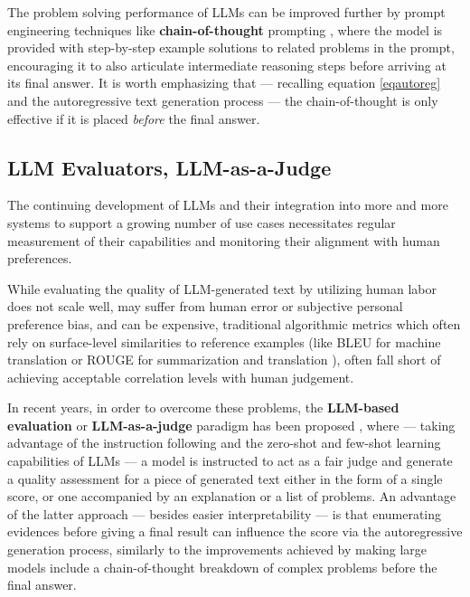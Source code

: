 \documentclass[noindent,nohyp,parspace,titlepage,twoside,12pt]{article}
\begin{document}
      The problem solving performance of LLMs can be improved further by
      prompt engineering techniques like \textbf{chain-of-thought} prompting
      \cite{cot}, where the model is provided with step-by-step example
      solutions to related problems in the prompt, encouraging it to also
      articulate intermediate reasoning steps before arriving at its final
      answer. It is worth emphasizing that --- recalling equation
      \ref{eqautoreg} and the autoregressive text generation process --- the
      chain-of-thought is only effective if it is placed \emph{before} the
      final answer.

    \subsection{LLM Evaluators, LLM-as-a-Judge}

      The continuing development of LLMs and their integration into more and
      more systems to support a growing number of use cases necessitates regular
      measurement of their capabilities and monitoring their alignment with
      human preferences.

      While evaluating the quality of LLM-generated text by utilizing human
      labor does not scale well, may suffer from human error or subjective
      personal preference bias, and can be expensive, traditional algorithmic
      metrics which often rely on surface-level similarities to reference
      examples (like BLEU for machine translation \cite{bleu} or ROUGE for
      summarization and translation \cite{rouge}), often fall short of achieving
      acceptable correlation levels with human judgement.

      In recent years, in order to overcome these problems, the
      \textbf{LLM-based evaluation} or \textbf{LLM-as-a-judge} paradigm has
      been proposed \cite{gptscore,chatgptgoodeval,reffree,geval},
      where --- taking advantage of the instruction following and the zero-shot
      and few-shot learning capabilities of LLMs --- a model is instructed to
      act as a fair judge and generate a quality assessment for a piece of
      generated text either in the form of a single score, or one accompanied by
      an explanation or a list of problems. An advantage of the latter approach
      --- besides easier interpretability --- is that enumerating evidences
      before giving a final result can influence the score via the
      autoregressive generation process, similarly to the improvements achieved
      by making large models include a chain-of-thought breakdown of complex
      problems before the final answer.
\end{document}
